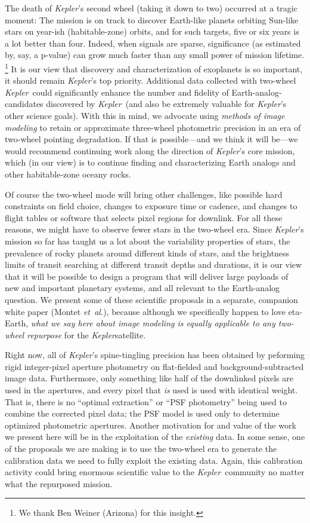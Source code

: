 \documentclass[letterpaper,12pt,whitepaper]{haastex}
\newcommand{\foreign}[1]{\textit{#1}}
\newcommand{\etal}{\foreign{et~al.}}
\newcommand{\observatory}[1]{\textsl{#1}}
\newcommand{\Kepler}{\observatory{Kepler}}
\begin{document}
The death of \Kepler's second wheel (taking it down to two)
  occurred at a tragic moment:
The mission is on track to discover Earth-like planets
  orbiting Sun-like stars on year-ish (habitable-zone) orbits,
  and for such targets, five or six years is a lot better than four.
Indeed, when signals are sparse, significance
  (as estimated by, say, a p-value)
  can grow much faster than any small power of mission lifetime.%
  \footnote{We thank Ben Weiner (Arizona) for this insight.}
It is our view that discovery and characterization of exoplanets is so important,
  it should remain \Kepler's top priority.
Additional data collected with two-wheel \Kepler\ could
  significantly enhance the number and fidelity of Earth-analog-candidates
  discovered by \Kepler\ (and
  also be extremely valuable for \Kepler's other science goals).
With this in mind, we advocate using \emph{methods of image modeling} to retain
  or approximate three-wheel photometric precision
  in an era of two-wheel pointing degradation.
If that is possible---and we think it will be---we would recommend continuing work
  along the direction of \Kepler's core mission,
  which (in our view) is to continue finding and characterizing
  Earth analogs and other habitable-zone oceany rocks.

Of course the two-wheel mode will bring other challenges, like
  possible hard constraints on field choice,
  changes to exposure time or cadence,
  and changes to flight tables or software that selects pixel regions for downlink.
For all these reasons, we might have to observe fewer stars in the two-wheel era.
Since \Kepler's mission so far has taught us a lot about the variability
  properties of stars,
  the prevalence of rocky planets around different kinds of stars,
  and the brightness limits of transit searching at different transit depths and durations,
  it is our view that it will be possible to design a program that will deliver
  large payloads of new and important planetary systems,
  and all relevant to the Earth-analog question.
We present some of these scientific proposals in a separate, companion white paper (Montet \etal),
  because although we specifically happen to love eta-Earth,
  \emph{what we say here about image modeling is equally applicable
  to any two-wheel repurpose} for the \Kepler satellite.

Right now, all of \Kepler's spine-tingling precision
  has been obtained by peforming rigid integer-pixel aperture photometry
  on flat-fielded and background-subtracted image data.
Furthermore, only something like half of the downlinked pixels are used in the apertures,
  and every pixel that \emph{is} used is used with identical weight.
That is, there is no ``optimal extraction'' or ``PSF photometry'' being
  used to combine the corrected pixel data;
  the PSF model is used only to determine optimized photometric apertures.
Another motivation for and value of the work we present here will be
  in the exploitation of the \emph{existing} data.
In some sense, one of the proposals we are making is to use the two-wheel era
  to generate the calibration data we need to fully exploit the existing data.
Again, this calibration activity could bring enormous scientific value to the \Kepler\ community
  no matter what the repurposed mission.
\end{document}
